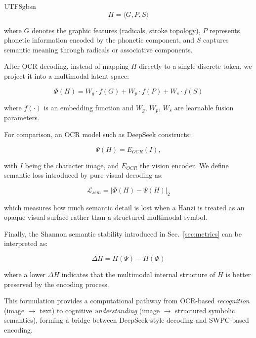 \documentclass[conference]{IEEEtran}
\begin{document}
\begin{CJK*}{UTF8}{gbsn}
\begin{equation}
H = \langle G, P, S \rangle
\end{equation}

where $G$ denotes the graphic features (radicals, stroke topology), $P$ represents phonetic information encoded by the phonetic component, and $S$ captures semantic meaning through radicals or associative components.

After OCR decoding, instead of mapping $H$ directly to a single discrete token, we project it into a multimodal latent space:

\begin{equation}
\Phi(H) = W_g \cdot f(G) + W_p \cdot f(P) + W_s \cdot f(S)
\end{equation}

where $f(\cdot)$ is an embedding function and $W_g$, $W_p$, $W_s$ are learnable fusion parameters.

For comparison, an OCR model such as DeepSeek constructs:

\begin{equation}
\Psi(H) = E_{OCR}(I),
\end{equation}

with $I$ being the character image, and $E_{OCR}$ the vision encoder. We define semantic loss introduced by pure visual decoding as:

\begin{equation}
\mathcal{L}_{sem} = | \Phi(H) - \Psi(H) |_2
\end{equation}

which measures how much semantic detail is lost when a Hanzi is treated as an opaque visual surface rather than a structured multimodal symbol.

Finally, the Shannon semantic stability introduced in Sec.~\ref{sec:metrics} can be interpreted as:

\begin{equation}
\Delta H = H(\Psi) - H(\Phi)
\end{equation}

where a lower $\Delta H$ indicates that the multimodal internal structure of $H$ is better preserved by the encoding process.

This formulation provides a computational pathway from OCR-based \textit{recognition} (image $\rightarrow$ text) to cognitive \textit{understanding} (image $\rightarrow$ structured symbolic semantics), forming a bridge between DeepSeek-style decoding and SWPC-based encoding.


\end{CJK*}
\end{document}
